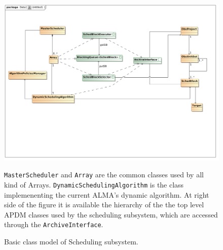 \begin{figure}	
\begin{center}
\includegraphics[width=\textwidth]{images/scheduling_class_model}
\caption{Basic class model of Scheduling subsystem.}
\end{center}
 \texttt{MasterScheduler} and \texttt{Array} are the common classes used by all kind of Arrays. \texttt{DynamicSchedulingAlgorithm} is the class implemenenting the current ALMA's dynamic algorithm. At right side of the figure it is available the hierarchy of the the top level APDM classes used by the scheduling subsystem, which are accessed through the \texttt{ArchiveInterface}.
\label{fig:sched-class-model}
\end{figure}

